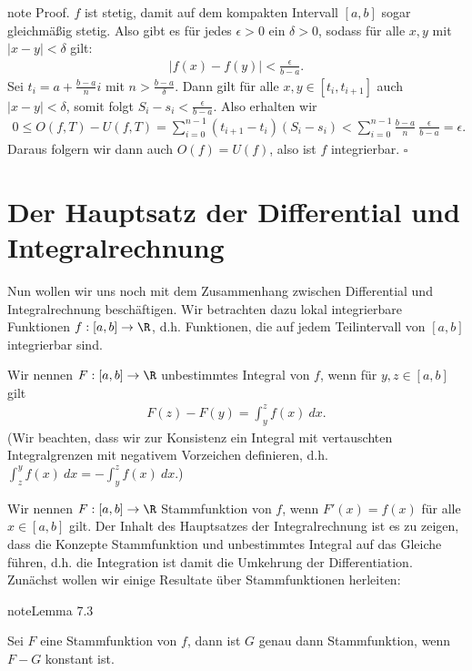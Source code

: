 \documentclass[letterpaper,10pt,english]{jupyterBook}
\begin{document}
\begin{sphinxadmonition}{note}
Proof.  \(f\) ist stetig, damit auf dem kompakten Intervall \([a,b]\) sogar gleichmäßig stetig. Also gibt es für jedes \(\epsilon >0 \) ein \(\delta > 0\), sodass für alle \(x,y\) mit \(|x-y| < \delta\) gilt:
\begin{equation*}
\begin{split} \vert f(x) - f(y) \vert < \frac{\epsilon}{b-a}.\end{split}
\end{equation*}
Sei \(t_i = a + \frac{b-a}{n} i\) mit \(n > \frac{b-a}\delta\). Dann gilt für alle \(x,y \in [t_i,t_{i+1}]\) auch \(|x-y| < \delta\), somit folgt
\(S_i - s_i < \frac{\epsilon}{b-a}\). Also erhalten wir
\begin{equation*}
\begin{split} 0 \leq O(f,T) - U(f,T) = \sum_{i=0}^{n-1} (t_{i+1}-t_i)(S_i-s_i) < \sum_{i=0}^{n-1} \frac{b-a}{n} ~ \frac{\epsilon}{b-a} = \epsilon.\end{split}
\end{equation*}
Daraus folgern wir dann auch \(O(f) = U(f)\), also ist \(f\) integrierbar. \(\square\)
\end{sphinxadmonition}


\section{Der Hauptsatz der Differential\sphinxhyphen{} und Integralrechnung}
\label{\detokenize{integration/hdi:der-hauptsatz-der-differential-und-integralrechnung}}\label{\detokenize{integration/hdi::doc}}
Nun wollen wir uns noch mit dem Zusammenhang zwischen Differential\sphinxhyphen{} und Integralrechnung beschäftigen. Wir betrachten dazu lokal integrierbare Funktionen \(f:[a,b] \rightarrow \R\), d.h. Funktionen, die auf jedem Teilintervall von \([a,b]\) integrierbar sind.

Wir nennen \(F:[a,b] \rightarrow \R\) unbestimmtes Integral von \(f\), wenn für \(y,z \in [a,b]\) gilt
\begin{equation*}
\begin{split} F(z) - F(y) = \int_y^z f(x)~dx.\end{split}
\end{equation*}
(Wir beachten, dass wir zur Konsistenz ein Integral mit vertauschten Integralgrenzen mit negativem Vorzeichen definieren, d.h.
\(\int_z^y f(x)~dx = - \int_y^z f(x)~dx. \))

Wir nennen \(F:[a,b] \rightarrow \R\) Stammfunktion von \(f\), wenn \(F'(x)=f(x)\) für alle \(x \in [a,b]\) gilt. Der Inhalt des Hauptsatzes der Integralrechnung ist es zu zeigen, dass die Konzepte Stammfunktion und unbestimmtes Integral auf das Gleiche führen, d.h. die Integration ist damit die Umkehrung der Differentiation.
Zunächst wollen wir einige Resultate über Stammfunktionen herleiten:
\label{integration/hdi:lemma-0}
\begin{sphinxadmonition}{note}{Lemma 7.3}



Sei \(F\) eine Stammfunktion von \(f\), dann ist \(G\) genau dann Stammfunktion, wenn \(F-G\) konstant ist.
\end{sphinxadmonition}
\end{document}
